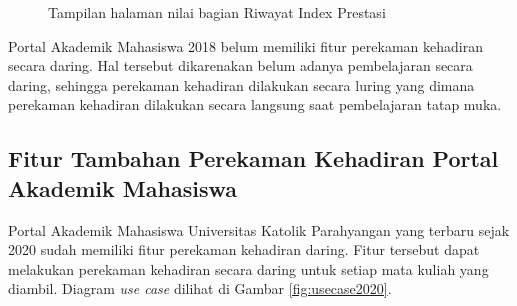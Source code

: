 \begin{enumerate}
\begin{figure}[H]
		\caption{Tampilan halaman nilai bagian Riwayat Index Prestasi} 
		\label{fig:rip_2018}
	\end{figure}
\end{enumerate}
Portal Akademik Mahasiswa 2018 belum memiliki fitur perekaman kehadiran secara daring. Hal tersebut dikarenakan belum adanya pembelajaran secara daring, sehingga perekaman kehadiran dilakukan secara luring yang dimana perekaman kehadiran dilakukan secara langsung saat pembelajaran tatap muka.

\subsection{Fitur Tambahan Perekaman Kehadiran Portal Akademik Mahasiswa}
\label{sec:alur} 
Portal Akademik Mahasiswa Universitas Katolik Parahyangan yang terbaru sejak 2020 sudah memiliki fitur perekaman kehadiran daring. Fitur tersebut dapat melakukan perekaman kehadiran secara daring untuk setiap mata kuliah yang diambil. Diagram \textit{use case} dilihat di Gambar \ref{fig:usecase2020}.

